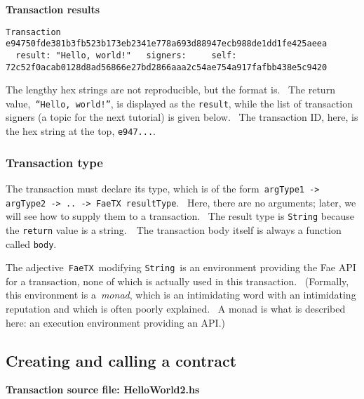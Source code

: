 \documentclass[11pt]{article}
\newcommand{\codeblock}[1]{\begin{mdframed}[
    backgroundcolor=header-color,
    linecolor=header-color,
    innertopmargin=10pt,
    ]{\texttt{#1}}\end{mdframed}}
\begin{document}
\textbf{Transaction results}

\codeblock{Transaction e94750fde381b3fb523b173eb2341e778a693d88947ecb988de1dd1fe425aeea\newline
  result: "Hello, world!"\newline
  signers:\newline
    self: 72c52f0acab0128d8ad56866e27bd2866aaa2c54ae754a917fafbb438e5c9420}

The lengthy hex strings are not reproducible, but the format is.  The return value, \texttt{“Hello, world!”}, is displayed as the \texttt{result}, while the list of transaction signers (a topic for the next tutorial) is given below.  The transaction ID, here, is the hex string at the top, \texttt{e947...}.

\subsubsection{Transaction type}
\vspace{5.5pt}

The transaction must declare its type, which is of the form \texttt{argType1 -}\texttt{\textgreater{}}\texttt{ argType2 -}\texttt{\textgreater{}}\texttt{ .. -}\texttt{\textgreater{}}\texttt{ FaeTX resultType}.  Here, there are no arguments; later, we will see how to supply them to a transaction.  The result type is \texttt{String} because the \texttt{return} value is a string.  The transaction body itself is always a function called \texttt{body}.


\vspace{11pt}

The adjective \texttt{FaeTX} modifying \texttt{String} is an environment providing the Fae API for a transaction, none of which is actually used in this transaction.  (Formally, this environment is a \textit{monad}, which is an intimidating word with an intimidating reputation and which is often poorly explained.  A monad is what is described here: an execution environment providing an API.) 

\subsection{Creating and calling a contract}
\vspace{5.5pt}

\textbf{Transaction source file: HelloWorld2.hs}
\end{document}

